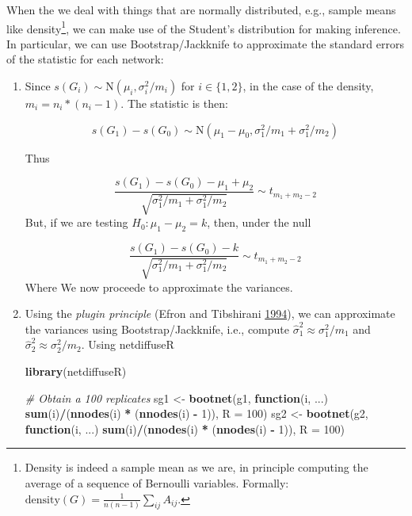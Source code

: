 \documentclass[]{book}
\newenvironment{Shaded}{\begin{snugshade}}{\end{snugshade}}
\newcommand{\CommentTok}[1]{\textcolor[rgb]{0.56,0.35,0.01}{\textit{#1}}}
\newcommand{\ControlFlowTok}[1]{\textcolor[rgb]{0.13,0.29,0.53}{\textbf{#1}}}
\newcommand{\DataTypeTok}[1]{\textcolor[rgb]{0.13,0.29,0.53}{#1}}
\newcommand{\DecValTok}[1]{\textcolor[rgb]{0.00,0.00,0.81}{#1}}
\newcommand{\KeywordTok}[1]{\textcolor[rgb]{0.13,0.29,0.53}{\textbf{#1}}}
\newcommand{\NormalTok}[1]{#1}
\newcommand{\OperatorTok}[1]{\textcolor[rgb]{0.81,0.36,0.00}{\textbf{#1}}}
\newcommand{\StringTok}[1]{\textcolor[rgb]{0.31,0.60,0.02}{#1}}
\begin{document}
When the we deal with things that are normally distributed, e.g., sample means
like density\footnote{Density is indeed a sample mean as we are, in principle
  computing the average of a sequence of Bernoulli variables. Formally:
  \(\mbox{density}(G) = \frac{1}{n(n-1)}\sum_{ij}A_{ij}\).},
we can make use of the Student's distribution for making inference. In particular,
we can use Bootstrap/Jackknife to approximate the standard errors of the statistic
for each network:

\begin{enumerate}
\def\labelenumi{\arabic{enumi}.}
\item
  Since \(s(G_i)\sim \mbox{N}(\mu_i,\sigma_i^2/m_i)\) for \(i\in\{1,2\}\), in the case
  of the density, \(m_i = n_i * (n_i - 1)\). The statistic is then:

  \[
  s(G_1) - s(G_0)\sim \mbox{N}(\mu_1-\mu_0, \sigma_1^2/m_1 + \sigma_1^2/m_2)
  \]

  Thus

  \[
  \frac{s(G_1) - s(G_0) - \mu_1 + \mu_2}{\sqrt{\sigma_1^2/{m_1} + \sigma_1^2/{m_2}}} \sim t_{m_1 + m_2 - 2}
  \]
  But, if we are testing \(H_0: \mu_1 - \mu_2 = k\), then, under the null

  \[
  \frac{s(G_1) - s(G_0) - k}{\sqrt{\sigma_1^2/{m_1} + \sigma_1^2/{m_2}}} \sim t_{m_1 + m_2 - 2}
  \]
  Where We now proceede to approximate the variances.
\item
  Using the \emph{plugin principle} (Efron and Tibshirani \protect\hyperlink{ref-Efron1994}{1994}), we can approximate the variances
  using Bootstrap/Jackknife, i.e., compute \(\hat\sigma_1^2\approx\sigma_1^2/m_1\) and
  \(\hat\sigma_2^2\approx\sigma_2^2/m_2\). Using netdiffuseR

\begin{Shaded}
\begin{Highlighting}[]
\KeywordTok{library}\NormalTok{(netdiffuseR)}

\CommentTok{# Obtain a 100 replicates}
\NormalTok{sg1 <-}\StringTok{ }\KeywordTok{bootnet}\NormalTok{(g1, }\ControlFlowTok{function}\NormalTok{(i, ...) }\KeywordTok{sum}\NormalTok{(i)}\OperatorTok{/}\NormalTok{(}\KeywordTok{nnodes}\NormalTok{(i) }\OperatorTok{*}\StringTok{ }\NormalTok{(}\KeywordTok{nnodes}\NormalTok{(i) }\OperatorTok{-}\StringTok{ }\DecValTok{1}\NormalTok{)), }\DataTypeTok{R =} \DecValTok{100}\NormalTok{)}
\NormalTok{sg2 <-}\StringTok{ }\KeywordTok{bootnet}\NormalTok{(g2, }\ControlFlowTok{function}\NormalTok{(i, ...) }\KeywordTok{sum}\NormalTok{(i)}\OperatorTok{/}\NormalTok{(}\KeywordTok{nnodes}\NormalTok{(i) }\OperatorTok{*}\StringTok{ }\NormalTok{(}\KeywordTok{nnodes}\NormalTok{(i) }\OperatorTok{-}\StringTok{ }\DecValTok{1}\NormalTok{)), }\DataTypeTok{R =} \DecValTok{100}\NormalTok{)}


\end{Highlighting}
\end{Shaded}
\end{enumerate}
\end{document}
